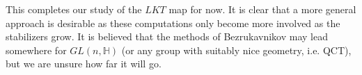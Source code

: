 \documentclass[letterpaper,twosided,11pt]{article}
\theoremstyle{plain}
\theoremstyle{definition}
\theoremstyle{remark}
\newcommand{\HH}{\mathbb{H}}
\begin{document}
This completes our study of the $LKT$ map for now. It is clear
 that a more general approach is desirable as these computations
  only become more involved as the stabilizers grow. It is believed
   that the methods of Bezrukavnikov may lead somewhere for
    $GL(n,\HH)$ (or any group with suitably nice geometry, i.e. QCT),
     but we are unsure how far it will go. 

    

    

   

       
	 
	



 
 
\end{document}
